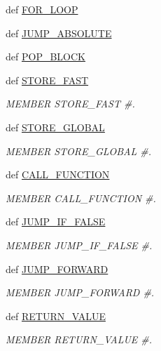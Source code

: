 \begin{DoxyCompactItemize}
\item 
def \hyperlink{classscipy_1_1weave_1_1bytecodecompiler_1_1CXXCoder_a78a5fbad3804027a7318b7947578d4dd}{F\+O\+R\+\_\+\+L\+O\+O\+P}
\item 
def \hyperlink{classscipy_1_1weave_1_1bytecodecompiler_1_1CXXCoder_a429898bb4ba52e792b59281674090102}{J\+U\+M\+P\+\_\+\+A\+B\+S\+O\+L\+U\+T\+E}
\item 
def \hyperlink{classscipy_1_1weave_1_1bytecodecompiler_1_1CXXCoder_aedf3a5af0e18a984c4b5aa1ccd418378}{P\+O\+P\+\_\+\+B\+L\+O\+C\+K}
\item 
def \hyperlink{classscipy_1_1weave_1_1bytecodecompiler_1_1CXXCoder_a5cb8e93bc35793a4c006928c96414fd6}{S\+T\+O\+R\+E\+\_\+\+F\+A\+S\+T}
\begin{DoxyCompactList}\small\item\em M\+E\+M\+B\+E\+R S\+T\+O\+R\+E\+\_\+\+F\+A\+S\+T \#. \end{DoxyCompactList}\item 
def \hyperlink{classscipy_1_1weave_1_1bytecodecompiler_1_1CXXCoder_a3a82c7d4d6bce5ae4cc0f4a9d72c547c}{S\+T\+O\+R\+E\+\_\+\+G\+L\+O\+B\+A\+L}
\begin{DoxyCompactList}\small\item\em M\+E\+M\+B\+E\+R S\+T\+O\+R\+E\+\_\+\+G\+L\+O\+B\+A\+L \#. \end{DoxyCompactList}\item 
def \hyperlink{classscipy_1_1weave_1_1bytecodecompiler_1_1CXXCoder_aed1a01aebdc8ff0f3b78c53389291050}{C\+A\+L\+L\+\_\+\+F\+U\+N\+C\+T\+I\+O\+N}
\begin{DoxyCompactList}\small\item\em M\+E\+M\+B\+E\+R C\+A\+L\+L\+\_\+\+F\+U\+N\+C\+T\+I\+O\+N \#. \end{DoxyCompactList}\item 
def \hyperlink{classscipy_1_1weave_1_1bytecodecompiler_1_1CXXCoder_aa868e8bc65f8428a5648b3897d76bb49}{J\+U\+M\+P\+\_\+\+I\+F\+\_\+\+F\+A\+L\+S\+E}
\begin{DoxyCompactList}\small\item\em M\+E\+M\+B\+E\+R J\+U\+M\+P\+\_\+\+I\+F\+\_\+\+F\+A\+L\+S\+E \#. \end{DoxyCompactList}\item 
def \hyperlink{classscipy_1_1weave_1_1bytecodecompiler_1_1CXXCoder_a0786c9702def1d5e229d4a84ca817064}{J\+U\+M\+P\+\_\+\+F\+O\+R\+W\+A\+R\+D}
\begin{DoxyCompactList}\small\item\em M\+E\+M\+B\+E\+R J\+U\+M\+P\+\_\+\+F\+O\+R\+W\+A\+R\+D \#. \end{DoxyCompactList}\item 
def \hyperlink{classscipy_1_1weave_1_1bytecodecompiler_1_1CXXCoder_a37f4fd50985c9e72fe453679a8f1d6bf}{R\+E\+T\+U\+R\+N\+\_\+\+V\+A\+L\+U\+E}
\begin{DoxyCompactList}\small\item\em M\+E\+M\+B\+E\+R R\+E\+T\+U\+R\+N\+\_\+\+V\+A\+L\+U\+E \#. \end{DoxyCompactList}\end{DoxyCompactItemize}
